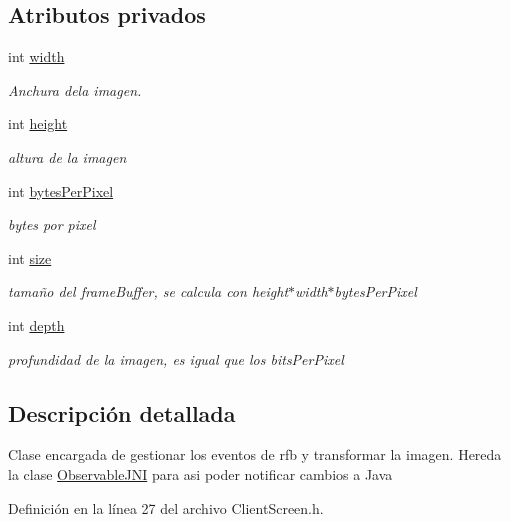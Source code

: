 \subsection*{Atributos privados}
\begin{DoxyCompactItemize}
\item 
int \hyperlink{classClientScreen_ac6f888c59861f6cca2f0ed9ea2c6b81b}{width}
\begin{DoxyCompactList}\small\item\em Anchura dela imagen. \end{DoxyCompactList}\item 
int \hyperlink{classClientScreen_ad6ead1ee3668a762e8fe2a0912ed282c}{height}
\begin{DoxyCompactList}\small\item\em altura de la imagen \end{DoxyCompactList}\item 
int \hyperlink{classClientScreen_a76eeef3335185b032cf23820a423b094}{bytes\-Per\-Pixel}
\begin{DoxyCompactList}\small\item\em bytes por pixel \end{DoxyCompactList}\item 
int \hyperlink{classClientScreen_acdc02740aa020f6b66a933213e0bec7e}{size}
\begin{DoxyCompactList}\small\item\em tamaño del frame\-Buffer, se calcula con height$\ast$width$\ast$bytes\-Per\-Pixel \end{DoxyCompactList}\item 
int \hyperlink{classClientScreen_ab56f74d3f4375a74a8275c61a128910d}{depth}
\begin{DoxyCompactList}\small\item\em profundidad de la imagen, es igual que los bits\-Per\-Pixel \end{DoxyCompactList}\end{DoxyCompactItemize}


\subsection{Descripción detallada}
Clase encargada de gestionar los eventos de rfb y transformar la imagen. Hereda la clase \hyperlink{classObservableJNI}{Observable\-J\-N\-I} para asi poder notificar cambios a Java 

Definición en la línea 27 del archivo Client\-Screen.\-h.



